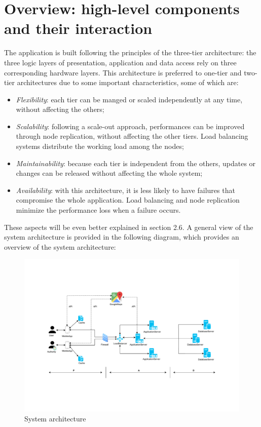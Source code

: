 \documentclass[12pt,a4paper]{report}
\begin{document}
		\section{Overview:	high-level	components	and	their	interaction}
	The application is built following the principles of the three-tier architecture: the three logic layers of presentation, 				application and data access rely on three corresponding hardware layers. This architecture is preferred to one-tier and 			two-tier architectures due to some important characteristics, some of which are:
	\begin{itemize}
	\item \emph{Flexibility}: each tier can be manged or scaled independently at any time, without affecting the others;
	\item \emph{Scalability}: following a scale-out approach, performances can be improved through node replication, without affecting the other tiers.
	Load balancing systems distribute the working load among the nodes;
	\item \emph{Maintainability}: because each tier is independent from the others, updates or changes can be released
	without affecting the whole system;
	\item \emph{Availability}: with this architecture, it is less likely to have failures that compromise the whole application.
	Load balancing and node replication minimize the performance loss when a failure occurs.
	\end{itemize}
	These aspects will be even better explained in section 2.6.
	A general view of the system architecture is provided in the following diagram, which provides an overview of the system architecture:
	\begin{figure}[H]
			\includegraphics[scale = 0.6, center]{sysarch}
			\caption{System architecture}
	\end{figure}
\end{document}
